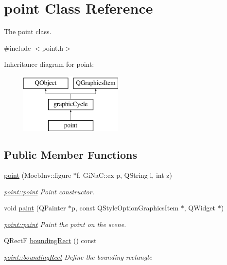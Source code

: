 \hypertarget{classpoint}{}\section{point Class Reference}
\label{classpoint}


The point class.  




{\ttfamily \#include $<$point.\+h$>$}

Inheritance diagram for point\+:\begin{figure}[H]
\begin{center}
\leavevmode
\includegraphics[height=3.000000cm]{classpoint}
\end{center}
\end{figure}
\subsection*{Public Member Functions}
\begin{DoxyCompactItemize}
\item 
\mbox{\hyperlink{classpoint_aabf8c59fffa6fb48ac1d9bcec101c3aa}{point}} (Moeb\+Inv\+::figure $\ast$f, Gi\+Na\+C\+::ex p, Q\+String l, int z)
\begin{DoxyCompactList}\small\item\em \mbox{\hyperlink{classpoint_aabf8c59fffa6fb48ac1d9bcec101c3aa}{point\+::point}} Point constructor. \end{DoxyCompactList}\item 
void \mbox{\hyperlink{classpoint_a5e75bab386500018e5d068c920ed0e66}{paint}} (Q\+Painter $\ast$p, const Q\+Style\+Option\+Graphics\+Item $\ast$, Q\+Widget $\ast$)
\begin{DoxyCompactList}\small\item\em \mbox{\hyperlink{classpoint_a5e75bab386500018e5d068c920ed0e66}{point\+::paint}} Paint the point on the scene. \end{DoxyCompactList}\item 
Q\+RectF \mbox{\hyperlink{classpoint_a91a81fc826052833e19e9d39ef3849d9}{bounding\+Rect}} () const
\begin{DoxyCompactList}\small\item\em \mbox{\hyperlink{classpoint_a91a81fc826052833e19e9d39ef3849d9}{point\+::bounding\+Rect}} Define the bounding rectangle \end{DoxyCompactList}\end{DoxyCompactItemize}
